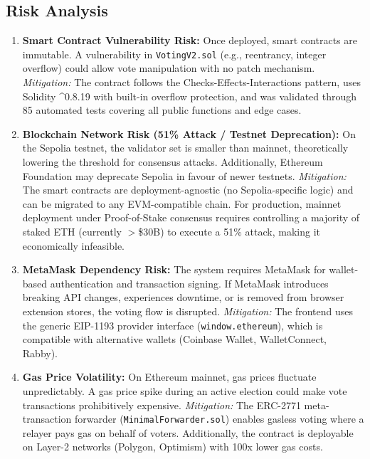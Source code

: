 \documentclass[oneside,a4paper,12pt]{book}
\begin{document}
\subsection{Risk Analysis}
\begin{enumerate}[leftmargin=1.5cm]
    \item \textbf{Smart Contract Vulnerability Risk:} Once deployed, smart contracts are immutable. A vulnerability in \texttt{VotingV2.sol} (e.g., reentrancy, integer overflow) could allow vote manipulation with no patch mechanism. \textit{Mitigation:} The contract follows the Checks-Effects-Interactions pattern, uses Solidity \^{}0.8.19 with built-in overflow protection, and was validated through 85 automated tests covering all public functions and edge cases.

    \item \textbf{Blockchain Network Risk (51\% Attack / Testnet Deprecation):} On the Sepolia testnet, the validator set is smaller than mainnet, theoretically lowering the threshold for consensus attacks. Additionally, Ethereum Foundation may deprecate Sepolia in favour of newer testnets. \textit{Mitigation:} The smart contracts are deployment-agnostic (no Sepolia-specific logic) and can be migrated to any EVM-compatible chain. For production, mainnet deployment under Proof-of-Stake consensus requires controlling a majority of staked ETH (currently $>$\$30B) to execute a 51\% attack, making it economically infeasible.

    \item \textbf{MetaMask Dependency Risk:} The system requires MetaMask for wallet-based authentication and transaction signing. If MetaMask introduces breaking API changes, experiences downtime, or is removed from browser extension stores, the voting flow is disrupted. \textit{Mitigation:} The frontend uses the generic EIP-1193 provider interface (\texttt{window.ethereum}), which is compatible with alternative wallets (Coinbase Wallet, WalletConnect, Rabby).

    \item \textbf{Gas Price Volatility:} On Ethereum mainnet, gas prices fluctuate unpredictably. A gas price spike during an active election could make vote transactions prohibitively expensive. \textit{Mitigation:} The ERC-2771 meta-transaction forwarder (\texttt{MinimalForwarder.sol}) enables gasless voting where a relayer pays gas on behalf of voters. Additionally, the contract is deployable on Layer-2 networks (Polygon, Optimism) with 100x lower gas costs.


\end{enumerate}
\end{document}

